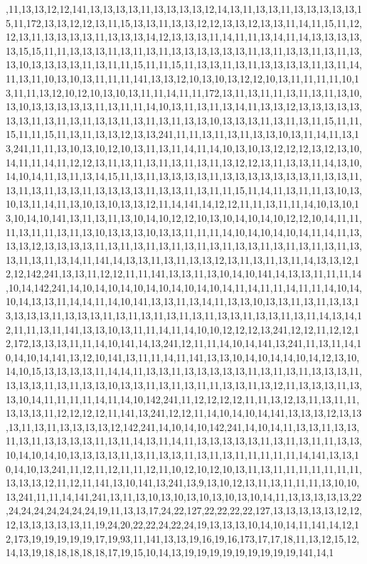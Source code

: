 ,11,13,13,12,12,141,13,13,13,13,11,13,13,13,13,12,14,13,11,13,13,11,13,13,13,13,13,15,11,172,13,13,12,12,13,11,15,13,13,11,13,13,12,12,13,13,12,13,13,11,14,11,15,11,12,12,13,11,13,13,13,13,11,13,13,13,14,12,13,13,13,11,14,11,11,13,14,11,14,13,13,13,13,13,15,15,11,11,13,13,13,11,13,11,13,11,13,13,13,13,13,13,11,13,11,13,13,11,13,11,13,13,10,13,13,13,13,11,13,11,11,15,11,11,15,11,13,13,11,13,11,13,13,13,13,11,13,11,14,11,13,11,10,13,10,13,11,11,11,141,13,13,12,10,13,10,13,12,12,10,13,11,11,11,11,10,13,11,11,13,12,10,12,10,13,10,13,11,11,14,11,11,172,13,11,13,11,11,13,11,13,11,13,10,13,10,13,13,13,13,13,11,13,11,11,14,10,13,11,13,11,13,14,11,13,13,12,13,13,13,13,13,13,13,11,13,11,13,11,13,13,11,13,11,13,11,13,13,10,13,13,13,11,13,11,13,11,15,11,11,15,11,11,15,11,13,11,13,13,12,13,13,241,11,11,13,11,13,11,13,13,10,13,11,14,11,13,13,241,11,11,13,10,13,10,12,10,13,11,13,11,14,11,14,10,13,10,13,12,12,12,13,12,13,10,14,11,11,14,11,12,12,13,11,13,11,13,11,13,11,13,11,13,12,12,13,11,13,13,11,14,13,10,14,10,14,11,13,11,13,14,15,11,13,11,13,13,13,13,11,13,13,13,13,13,13,13,11,13,13,11,13,11,13,11,13,13,11,13,13,13,13,11,13,13,11,13,11,11,15,11,14,11,13,11,11,13,10,13,10,13,11,14,11,13,10,13,10,13,13,12,11,14,141,14,12,12,11,11,13,11,11,14,10,13,10,13,10,14,10,141,13,11,13,11,13,10,14,10,12,12,10,13,10,14,10,14,10,12,12,10,14,11,11,11,13,11,11,13,11,13,10,13,13,13,10,13,13,11,11,11,14,10,14,10,14,10,14,11,14,11,13,13,13,12,13,13,13,13,11,13,11,13,11,13,11,13,11,13,11,13,13,11,13,11,13,11,13,11,13,13,11,13,11,13,14,11,141,14,13,13,11,13,11,13,13,12,13,11,13,11,13,11,14,13,13,12,12,12,142,241,13,13,11,12,12,11,11,141,13,13,11,13,10,14,10,141,14,13,13,11,11,11,14,10,14,142,241,14,10,14,10,14,10,14,10,14,10,14,10,14,11,14,11,11,14,11,11,14,10,14,10,14,13,13,11,14,14,11,14,10,141,13,13,11,13,14,11,13,13,10,13,13,11,13,11,13,13,13,13,13,13,11,13,13,13,11,13,11,13,11,13,11,13,11,13,13,11,13,13,11,13,11,14,13,14,12,11,11,13,11,141,13,13,10,13,11,11,14,11,14,10,10,12,12,12,13,241,12,12,11,12,12,12,172,13,13,13,11,11,14,10,141,14,13,241,12,11,11,14,10,14,141,13,241,11,13,11,14,10,14,10,14,141,13,12,10,141,13,11,11,14,11,141,13,13,10,14,10,14,14,10,14,12,13,10,14,10,15,13,13,13,13,11,14,14,11,13,13,11,13,13,13,13,13,11,13,11,13,11,13,13,13,11,13,13,13,11,13,11,13,13,10,13,13,11,13,11,13,11,11,13,13,11,13,12,11,13,13,13,11,13,13,10,14,11,11,11,11,14,11,14,10,142,241,11,12,12,12,12,11,11,13,12,13,11,13,11,11,13,13,13,11,12,12,12,12,11,141,13,241,12,12,11,14,10,14,10,14,141,13,13,13,12,13,13,13,11,13,11,13,13,13,13,12,142,241,14,10,14,10,142,241,14,10,14,11,13,13,11,13,13,11,13,11,13,13,13,13,11,13,11,14,13,11,14,11,13,13,13,13,13,11,13,11,13,11,11,13,13,10,14,10,14,10,13,13,13,13,11,13,11,13,13,11,13,11,13,11,11,11,11,11,14,141,13,13,10,14,10,13,241,11,12,11,12,11,11,12,11,10,12,10,12,10,13,11,13,11,11,11,11,11,11,11,13,13,13,12,11,12,11,141,13,10,141,13,241,13,9,13,10,12,13,11,13,11,11,11,13,10,10,13,241,11,11,14,141,241,13,11,13,10,13,10,13,10,13,10,13,10,14,11,13,13,13,13,13,22,24,24,24,24,24,24,24,19,11,13,13,17,24,22,127,22,22,22,22,127,13,13,13,13,13,12,12,12,13,13,13,13,13,11,19,24,20,22,22,24,22,24,19,13,13,13,10,14,10,14,11,141,14,12,12,173,19,19,19,19,19,17,19,93,11,141,13,13,19,16,19,16,173,17,17,18,11,13,12,15,12,14,13,19,18,18,18,18,18,17,19,15,10,14,13,19,19,19,19,19,19,19,19,19,141,14,1